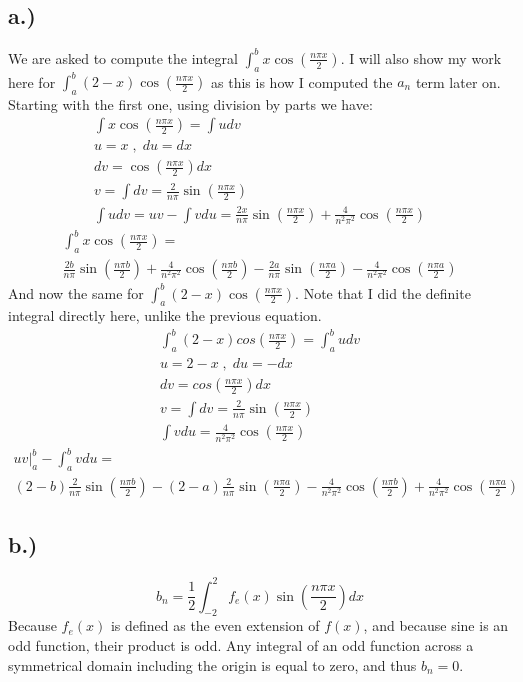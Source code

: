 \documentclass{article}
\begin{document}
\subsection*{a.)}
We are asked to compute the integral $\int_a^b x\cos(\frac{n\pi x}{2})$. I will also show my work here for $\int_a^b (2-x)\cos(\frac{n\pi x}{2})$ as this is how I computed the $a_n$ term later on. Starting with the first one, using division by parts we have:
\begin{equation}
\begin{aligned}
\int x\cos(\frac{n\pi x}{2}) = \int udv\\
u = x \; , \; du = dx\\
dv = \cos(\frac{n\pi x}{2})dx\\
v = \int dv = \frac{2}{n\pi}\sin(\frac{n\pi x}{2})\\
\int udv = uv - \int vdu = \frac{2x}{n\pi}\sin(\frac{n\pi x}{2}) + \frac{4}{n^2\pi^2}\cos(\frac{n\pi x}{2})
\end{aligned}
\end{equation}
\begin{multline}
\int_a^b x\cos(\frac{n\pi x}{2}) = \\ \frac{2b}{n\pi}\sin(\frac{n\pi b}{2}) + \frac{4}{n^2\pi^2}\cos(\frac{n\pi b}{2}) - \frac{2a}{n\pi}\sin(\frac{n\pi a}{2}) - \frac{4}{n^2\pi^2}\cos(\frac{n\pi a}{2})
\end{multline}
And now the same for $\int_a^b (2-x)\cos(\frac{n\pi x}{2})$. Note that I did the definite integral directly here, unlike the previous equation.
\begin{equation}
\begin{aligned}
\int_a^b (2-x)cos(\frac{n\pi x}{2}) = \int_a^b udv\\
u = 2-x  \; , \; du = -dx\\
dv = cos(\frac{n\pi x}{2})dx\\
v = \int dv = \frac{2}{n\pi}\sin(\frac{n\pi x}{2})\\
\int vdu = \frac{4}{n^2\pi^2}\cos(\frac{n\pi x}{2})
\end{aligned}
\end{equation}
\begin{multline}
uv\Big|_a^b - \int_a^b vdu = \\ (2-b)\frac{2}{n\pi}\sin(\frac{n\pi b}{2}) - (2-a)\frac{2}{n\pi}\sin(\frac{n\pi a}{2}) - \frac{4}{n^2\pi^2}\cos(\frac{n\pi b}{2}) + \frac{4}{n^2\pi^2}\cos(\frac{n\pi a}{2})
\end{multline}
\subsection*{b.)}
\begin{equation}
b_n = \frac{1}{2} \int_{-2}^2 f_e(x)\sin(\frac{n\pi x}{2})dx
\end{equation}
Because $f_e(x)$ is defined as the even extension of $f(x)$, and because sine is an odd function, their product is odd. Any integral of an odd function across a symmetrical domain including the origin is equal to zero, and thus $b_n = 0$.
\end{document}
